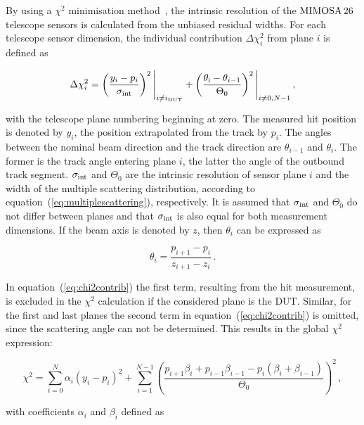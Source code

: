 By using a $\chi^{2}$ minimisation method~\cite{ref:eudetmemo_2007_01,ref:lutzpaper}, the intrinsic resolution of the $\textrm{MIMOSA\,26}$ telescope sensors is calculated from the unbiased residual widths.
For each telescope sensor dimension, the individual contribution $\Delta \chi^2_{i}$ from plane $i$ is defined as

\begin{equation}
\label{eq:chi2contrib}
\Delta \chi^2_{i} = \left( \frac{y_{i} - p_{i}}{\sigma_{\textrm{int}}} \right)^2 \Bigg|_{i \ne i_{\textrm{DUT}}} +
\left( \frac{\theta_{\textrm{i}} - \theta_{i-1}}{\Theta_{0}} \right)^2 \Bigg|_{i \ne 0,N-1} \,,
\end{equation}

with the telescope plane numbering beginning at zero.
The measured hit position is denoted by $y_{i}$, the position extrapolated from the track by $p_{i}$.
The angles between the nominal beam direction and the track direction are $\theta_{i-1}$ and $\theta_{i}$.
The former is the track angle entering plane $i$, the latter the angle of the outbound track segment.
$\sigma_{\textrm{int}}$ and $\Theta_{0}$ are the intrinsic resolution of sensor plane $i$ and the width of the multiple scattering distribution, according to equation~(\ref{eq:multiplescattering}), respectively.
It is assumed that $\sigma_{\textrm{int}}$ and $\Theta_{0}$ do not differ between planes and that $\sigma_{\textrm{int}}$ is also equal for both measurement dimensions.
If the beam axis is denoted by $z$, then $\theta_i$ can be expressed as

\begin{equation}
\theta_i = \frac{p_{i+1} - p_i}{z_{i+1} - z_i} \,.
\end{equation}


In equation~(\ref{eq:chi2contrib}) the first term, resulting from the hit measurement, is excluded in the $\chi^2$ calculation if the considered plane is the DUT.
Similar, for the first and last planes the second term in equation~(\ref{eq:chi2contrib}) is omitted, since the scattering angle can not be determined.
This results in the global $\chi^2$ expression:

\begin{equation}
\label{eq:globalchi2}
\chi^2 = \sum_{i=0}^{N} \alpha_i \left( y_i - p_i \right)^2 + \sum_{i=1}^{N-1}
\left( \frac{p_{i + 1} \beta_i + p_{i-1} \beta_{i-1} - p_i \left( \beta_i + \beta_{i-1} \right)}{\Theta_0} \right)^2 \,,
\end{equation}

\noindent
with coefficients $\alpha_i$ and $\beta_i$ defined as~\cite{ref:eudetmemo_2007_01}

